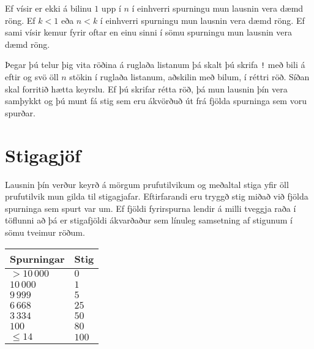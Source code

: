 Ef vísir er ekki á bilinu $1$ upp í $n$ í einhverri spurningu mun lausnin vera dæmd röng.
Ef $k < 1$ eða $n < k$ í einhverri spurningu mun lausnin vera dæmd röng.
Ef sami vísir kemur fyrir oftar en einu sinni í sömu spurningu mun lausnin vera dæmd röng.

Þegar þú telur þig vita röðina á ruglaða listanum þá skalt þú
skrifa \texttt{!} með bili á eftir og svö öll $n$ stökin í ruglaða listanum,
aðskilin með bilum, í réttri röð. Síðan skal forritið hætta keyrslu.
Ef þú skrifar rétta röð, þá mun lausnin þín vera samþykkt og þú munt fá stig
sem eru ákvörðuð út frá fjölda spurninga sem voru spurðar.

\section*{Stigagjöf}
Lausnin þín verður keyrð á mörgum prufutilvikum og meðaltal stiga yfir
öll prufutilvik mun gilda til stigagjafar.
Eftirfarandi eru tryggð stig miðað við fjölda spurninga sem spurt var um.
Ef fjöldi fyrirspurna lendir á milli tveggja raða í töflunni að þá er
stigafjöldi ákvarðaður sem línuleg samsetning af stigunum í sömu tveimur röðum.

\begin{tabular}{|l|l|}
    \hline
Spurningar & Stig    \\ \hline
$> 10\,000$  & $0$     \\ \hline
$10\,000$    & $1$     \\ \hline
$9\,999$     & $5$     \\ \hline
$6\,668$     & $25$    \\ \hline
$3\,334$     & $50$    \\ \hline
$100$      & $80$    \\ \hline
$\leq 14$  & $100$ \\ \hline
\end{tabular}
